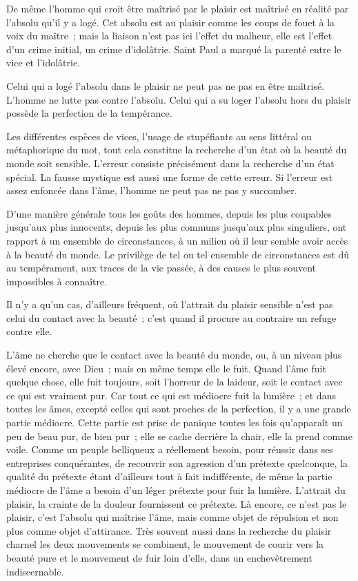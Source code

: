 \documentclass[french,twoside]{book} %
\begin{document}
De même l'homme qui croit être maîtrisé par le plaisir est maîtrisé en réalité par l'absolu qu'il y a logé. Cet absolu est au plaisir comme les coups de fouet à la voix du maître ; mais la liaison n'est pas ici l'effet du malheur, elle est l'effet d'un crime initial, un crime d'idolâtrie. Saint Paul a marqué la parenté entre le vice et l'idolâtrie.\par
Celui qui a logé l'absolu dans le plaisir ne peut pas ne pas en être maîtrisé. L'homme ne lutte pas contre l'absolu. Celui qui a su loger l'absolu hors du plaisir possède la perfection de la tempérance.\par
Les différentes espèces de vices, l'usage de stupéfiants au sens littéral ou métaphorique du mot, tout cela constitue la recherche d'un état où la beauté du monde soit sensible. L'erreur consiste précisément dans la recherche d'un état spécial. La fausse mystique est aussi une forme de cette erreur. Si l'erreur est assez enfoncée dans l'âme, l'homme ne peut pas ne pas y succomber.\par
D'une manière générale tous les goûts des hommes, depuis les plus coupables jusqu'aux plus innocents, depuis les plus communs jusqu'aux plus singuliers, ont rapport à un ensemble de circonstances, à un milieu où il leur semble avoir accès à la beauté du monde. Le privilège de tel ou tel ensemble de circonstances est dû au tempérament, aux traces de la vie passée, à des causes le plus souvent impossibles à connaître.\par
Il n'y a qu'un cas, d'ailleurs fréquent, où l'attrait du plaisir sensible n'est pas celui du contact avec la beauté ; c'est quand il procure au contraire un refuge contre elle.\par
L'âme ne cherche que le contact avec la beauté du monde, ou, à un niveau plus élevé encore, avec Dieu ; mais en même temps elle le fuit. Quand l'âme fuit quelque chose, elle fuit toujours, soit l'horreur de la laideur, soit le contact avec ce qui est vraiment pur. Car tout ce qui est médiocre fuit la lumière ; et dans toutes les âmes, excepté celles qui sont proches de la perfection, il y a une grande partie médiocre. Cette partie est prise de panique toutes les fois qu'apparaît un peu de beau pur, de bien pur ; elle se cache derrière la chair, elle la prend comme voile. Comme un peuple belliqueux a réellement besoin, pour réussir dans ses entreprises conquérantes, de recouvrir son agression d'un prétexte quelconque, la qualité du prétexte étant d'ailleurs tout à fait indifférente, de même la partie médiocre de l'âme a besoin d'un léger prétexte pour fuir la lumière. L'attrait du plaisir, la crainte de la douleur fournissent ce prétexte. Là encore, ce n'est pas le plaisir, c'est l'absolu qui maîtrise l'âme, mais comme objet de répulsion et non plus comme objet d'attirance. Très souvent aussi dans la recherche du plaisir charnel les deux mouvements se combinent, le mouvement de courir vers la beauté pure et le mouvement de fuir loin d'elle, dans un enchevêtrement indiscernable.\par
\end{document}
